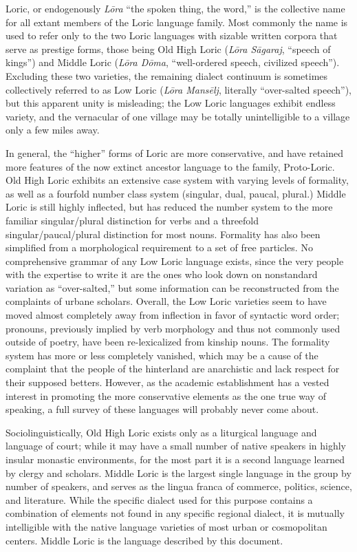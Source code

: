 \documentclass{article}
\begin{document}
Loric, or endogenously \textit{L\={o}ra} ``the spoken thing, the word,'' is the collective name for all extant members of the Loric language family.  Most commonly the name is used to refer only to the two Loric languages with sizable written corpora that serve as prestige forms, those being Old High Loric (\textit{L\={o}ra S\={a}garaj}, ``speech of kings'') and Middle Loric (\textit{L\={o}ra D\={o}ma}, ``well-ordered speech, civilized speech''). Excluding these two varieties, the remaining dialect continuum is sometimes collectively referred to as Low Loric (\textit{L\={o}ra Mans\={e}lj}, literally ``over-salted speech''), but this apparent unity is misleading; the Low Loric languages exhibit endless variety, and the vernacular of one village may be totally unintellig\-ible to a village only a few miles away.

In general, the ``higher'' forms of Loric are more conservative, and have retained more features of  the now extinct ancestor language to the family, Proto-Loric. Old High Loric exhibits an extensive case system with varying levels of formality, as well as a fourfold number class system (singular, dual, paucal, plural.) Middle Loric is still highly inflected, but has reduced the number system to the more familiar singular/plural distinction for verbs and a threefold singular/paucal/plural distinction for most nouns. Formality has also been simplified from a morphological requirement to a set of free particles. No comprehensive grammar of any Low Loric language exists, since the very people with the expertise to write it are the ones who look down on nonstandard variation as ``over-salted,'' but some information can be reconstructed from the complaints of urbane scholars. Overall, the Low Loric varieties seem to have moved almost completely away from inflection in favor of syntactic word order; pronouns, previously implied by verb morphology and thus not commonly used outside of poetry, have been re-lexicalized from kinship nouns. The formality system has more or less completely vanished, which may be a cause of the complaint that the people of the hinterland are anarchistic and lack respect for their supposed betters. However, as the academic establishment has a vested interest in promoting the more conservative elements as the one true way of speaking, a full survey of these languages will probably never come about.

Sociolinguistically, Old High Loric exists only as a liturgical language and language of court; while it may have a small number of native speakers in highly insular monastic environments, for the most part it is a second language learned by clergy and scholars. Middle Loric is the largest single language in the group by number of speakers, and serves as the lingua franca of commerce, politics, science, and literature. While the specific dialect used for this purpose contains a combination of elements not found in any specific regional dialect, it is mutually intelligible with the native language varieties of most urban or cosmopolitan centers. Middle Loric is the language described by this document.
\end{document}
